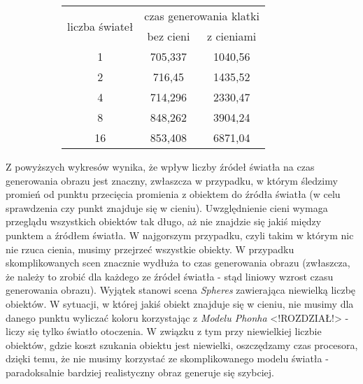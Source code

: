 \begin{figure}[!htb]
\advance\leftskip-2cm
\begin{subfigure}{.5\textwidth}
\end{subfigure}
\hspace{2cm}
\begin{subfigure}{.5\textwidth}
		\begin{longtable}{|c|c|c|} \hline
		\multirow{2}{*}{liczba świateł} & \multicolumn{2}{|c|}{czas generowania klatki} \\ \cline{2-3}
	    & bez cieni & z cieniami \\ \hline
	    1 & 705,337 & 1040,56 \\
	    2 & 716,45 & 1435,52 \\
		4 & 714,296 & 2330,47 \\
		8 & 848,262 & 3904,24 \\
		16 & 853,408 & 6871,04 \\
		\hline
		\end{longtable}
\end{subfigure}
\end{figure}

Z powyższych wykresów wynika, że wpływ liczby źródeł światła na czas generowania obrazu jest znaczny, zwłaszcza w przypadku, w którym śledzimy promień od punktu przecięcia promienia z obiektem do źródła światła (w celu sprawdzenia czy punkt znajduje się w cieniu). Uwzględnienie cieni wymaga przeglądu wszystkich obiektów tak długo, aż nie znajdzie się jakiś między punktem a źródłem światła. W najgorszym przypadku, czyli takim w którym nic nie rzuca cienia, musimy przejrzeć wszystkie obiekty. W przypadku skomplikowanych scen znacznie wydłuża to czas generowania obrazu (zwłaszcza, że należy to zrobić dla każdego ze źródeł światła - stąd liniowy wzrost czasu generowania obrazu). Wyjątek stanowi scena \emph{Spheres} zawierająca niewielką liczbę obiektów. W sytuacji, w której jakiś obiekt znajduje się w cieniu, nie musimy dla danego punktu wyliczać koloru korzystając z \emph{Modelu Phonha} <!ROZDZIAŁ!> - liczy się tylko światło otoczenia. W związku z tym przy niewielkiej liczbie obiektów, gdzie koszt szukania obiektu jest niewielki, oszczędzamy czas procesora, dzięki temu, że nie musimy korzystać ze skomplikowanego modelu światła - paradoksalnie bardziej realistyczny obraz generuje się szybciej.


